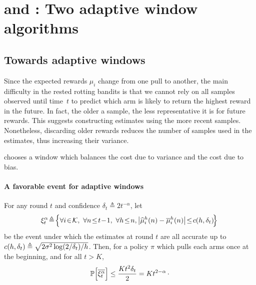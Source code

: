 
\section{{\FEWA} and {\RAW} : Two adaptive window algorithms}

\subsection{Towards adaptive windows}
Since the expected rewards $\mu_i$ change from one pull to another, the main difficulty in the rested rotting bandits is that we cannot rely on all samples observed until time~$t$ to predict which arm is likely to return the highest reward in the future. In fact, the older a sample, the less representative it is for future rewards. This suggests constructing estimates using the more recent samples. Nonetheless, discarding older rewards reduces the number of samples used in the estimates, thus increasing their variance. 

\SWA chooses a window which balances the cost due to variance and the cost due to bias. %


\paragraph{A favorable event for adaptive windows}
\begin{proposition}
\label{prop:prb_favorable_event}
For any round $t$ and confidence $\delta_{t} \triangleq 2t^{-\alpha}$, let 
%
\begin{equation}
\!\HPevent\! \triangleq\! \Big\{ \forall i\!\in\!\arms,\ \forall n \!\leq\! t\!-\!1 ,\ \forall h \!\leq\! n, \big| \hmu^h_i(n) - \bmu^h_i(n) \big| \!\leq\! c(h, \delta_{t}) \!\Big\}
\label{eq:def_favorable_event}
\end{equation}
 be the event under which the estimates at round $t$  are all accurate up to $c(h,\delta_{t}) \triangleq \sqrt{2 \sigma^2\log(2/\delta_t)/h}$. Then, for a policy $\pi$ which pulls each arms once at the beginning, and for all $t>K$,
\[
\mathbb{P}\Big[\overline{\xi^\alpha_t}\Big] \leq \frac{Kt^2\delta_{t}}{2}=Kt^{2-\alpha}\,\cdot
\]
\end{proposition} 

